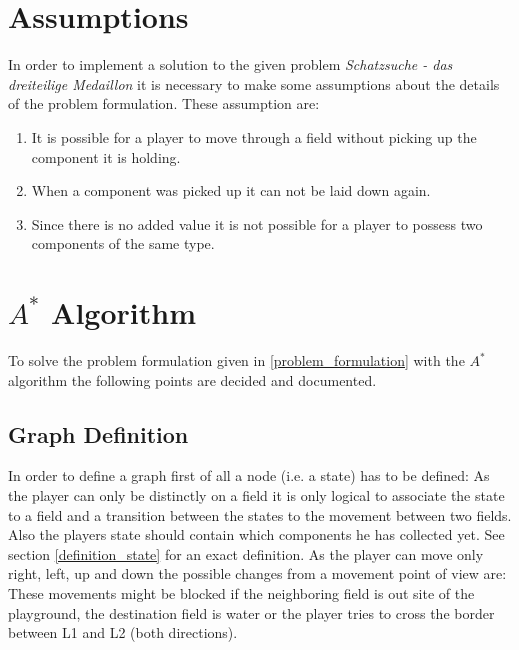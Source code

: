 \documentclass{article}
\newcommand{\problem}{Schatzsuche - das dreiteilige Medaillon}
\begin{document}
\section{Assumptions}
In order to implement a solution to the given problem \textit{\problem} it is necessary to make some assumptions about the details of the problem formulation. These assumption are:
\begin{enumerate}
    \item It is possible for a player to move through a field without picking up the component it is holding. 
    \item When a component was picked up it can not be laid down again.
    \item Since there is no added value it is not possible for a player to possess two components of the same type.
\end{enumerate}


\section{$A^*$ Algorithm}
To solve the problem formulation given in \ref{problem_formulation} with the $A^*$ algorithm the following points are decided and documented.

\subsection{Graph Definition}
In order to define a graph first of all a node (i.e. a state) has to be defined: As the player can only be distinctly on a field it is only logical to associate the state to a field and a transition between the states to the movement between two fields. Also the players state should contain which components he has collected yet. See section \ref{definition_state} for an exact definition. As the player can move only right, left, up and down the possible changes from a movement point of view are:
These movements might be blocked if the neighboring field is out site of the playground, the destination field is water or the player tries to cross the border between L1 and L2 (both directions).
\end{document}
